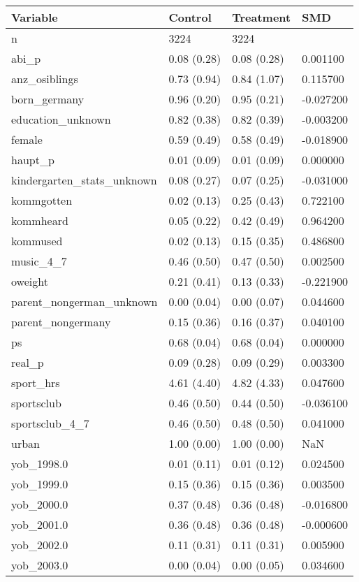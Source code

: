 \begin{tabular}{llll}
\toprule
Variable & Control & Treatment & SMD \\
\midrule
n & 3224 & 3224 &  \\
abi\_p & 0.08 (0.28) & 0.08 (0.28) & 0.001100 \\
anz\_osiblings & 0.73 (0.94) & 0.84 (1.07) & 0.115700 \\
born\_germany & 0.96 (0.20) & 0.95 (0.21) & -0.027200 \\
education\_unknown & 0.82 (0.38) & 0.82 (0.39) & -0.003200 \\
female & 0.59 (0.49) & 0.58 (0.49) & -0.018900 \\
haupt\_p & 0.01 (0.09) & 0.01 (0.09) & 0.000000 \\
kindergarten\_stats\_unknown & 0.08 (0.27) & 0.07 (0.25) & -0.031000 \\
kommgotten & 0.02 (0.13) & 0.25 (0.43) & 0.722100 \\
kommheard & 0.05 (0.22) & 0.42 (0.49) & 0.964200 \\
kommused & 0.02 (0.13) & 0.15 (0.35) & 0.486800 \\
music\_4\_7 & 0.46 (0.50) & 0.47 (0.50) & 0.002500 \\
oweight & 0.21 (0.41) & 0.13 (0.33) & -0.221900 \\
parent\_nongerman\_unknown & 0.00 (0.04) & 0.00 (0.07) & 0.044600 \\
parent\_nongermany & 0.15 (0.36) & 0.16 (0.37) & 0.040100 \\
ps & 0.68 (0.04) & 0.68 (0.04) & 0.000000 \\
real\_p & 0.09 (0.28) & 0.09 (0.29) & 0.003300 \\
sport\_hrs & 4.61 (4.40) & 4.82 (4.33) & 0.047600 \\
sportsclub & 0.46 (0.50) & 0.44 (0.50) & -0.036100 \\
sportsclub\_4\_7 & 0.46 (0.50) & 0.48 (0.50) & 0.041000 \\
urban & 1.00 (0.00) & 1.00 (0.00) & NaN \\
yob\_1998.0 & 0.01 (0.11) & 0.01 (0.12) & 0.024500 \\
yob\_1999.0 & 0.15 (0.36) & 0.15 (0.36) & 0.003500 \\
yob\_2000.0 & 0.37 (0.48) & 0.36 (0.48) & -0.016800 \\
yob\_2001.0 & 0.36 (0.48) & 0.36 (0.48) & -0.000600 \\
yob\_2002.0 & 0.11 (0.31) & 0.11 (0.31) & 0.005900 \\
yob\_2003.0 & 0.00 (0.04) & 0.00 (0.05) & 0.034600 \\
\bottomrule
\end{tabular}
